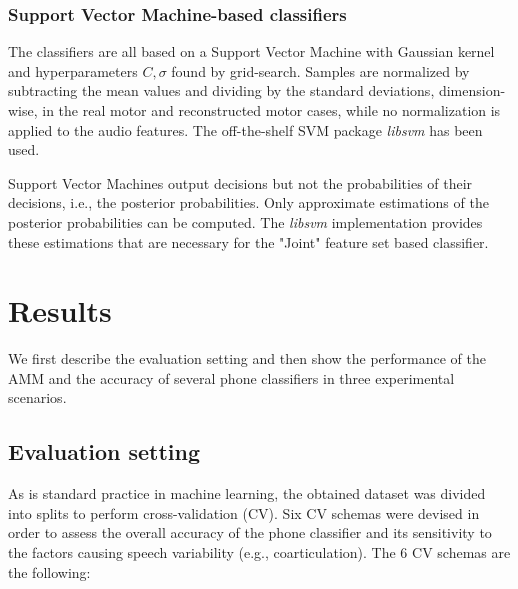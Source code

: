 \documentclass[10pt]{article}
\newcommand{\vlio}{\textsf{vlio}}
\newcommand{\vttu}{\textsf{vttu}}
\newcommand{\alio}{\textsf{alio}}
\newcommand{\attu}{\textsf{attu}}
\begin{document}
\subsubsection*{Support Vector Machine-based  classifiers}
The classifiers are all based on a Support Vector Machine \cite{BGV92} with Gaussian kernel
and hyperparameters $C, \sigma$ found by grid-search. Samples are normalized
by subtracting the mean values and dividing by the standard deviations,
dimension-wise, in the real motor and reconstructed motor cases, while
no normalization is applied to the audio features. The off-the-shelf SVM
package \emph{libsvm} \cite{libsvm} has been used.

Support Vector Machines output decisions but not the probabilities of their 
decisions, i.e., the posterior probabilities. Only approximate estimations of 
the posterior probabilities can be computed. The \emph{libsvm} implementation provides these
estimations that are necessary for the "Joint" feature set based classifier.

\section*{Results}
We first describe the evaluation setting and then show the performance of the AMM and the accuracy of several phone classifiers in three experimental scenarios. 

\subsection*{Evaluation setting}
\label{subsec:cv}

As is standard practice in machine learning, the obtained dataset was divided into
splits to perform cross-validation (CV). 
Six CV schemas were devised in order to assess the overall accuracy of the phone classifier and its
sensitivity to the factors causing speech variability (e.g., coarticulation). The $6$ CV schemas
are the following:
\end{document}
